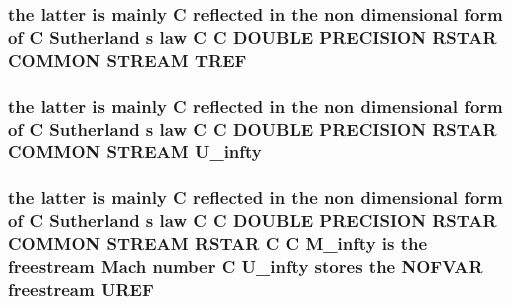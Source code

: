 \hypertarget{msa20_2home_2abonfi_2_c_f_d__codes_2_eul_f_s_83_82_83_2include_2stream_8com_a8c4a60ca1b033fbd4e2cadaf15146ca5}{
\subsubsection[{T\-R\-E\-F}]{\setlength{\rightskip}{0pt plus 5cm}the latter is mainly C reflected in the non dimensional form of C Sutherland s law C C D\-O\-U\-B\-L\-E P\-R\-E\-C\-I\-S\-I\-O\-N R\-S\-T\-A\-R C\-O\-M\-M\-O\-N S\-T\-R\-E\-A\-M T\-R\-E\-F}}\label{msa20_2home_2abonfi_2_c_f_d__codes_2_eul_f_s_83_82_83_2include_2stream_8com_a8c4a60ca1b033fbd4e2cadaf15146ca5}
\hypertarget{msa20_2home_2abonfi_2_c_f_d__codes_2_eul_f_s_83_82_83_2include_2stream_8com_a396c12357ce60c0aaccd169e136b5d9a}{
\subsubsection[{U\-\_\-infty}]{\setlength{\rightskip}{0pt plus 5cm}the latter is mainly C reflected in the non dimensional form of C Sutherland s law C C D\-O\-U\-B\-L\-E P\-R\-E\-C\-I\-S\-I\-O\-N R\-S\-T\-A\-R C\-O\-M\-M\-O\-N S\-T\-R\-E\-A\-M U\-\_\-infty}}\label{msa20_2home_2abonfi_2_c_f_d__codes_2_eul_f_s_83_82_83_2include_2stream_8com_a396c12357ce60c0aaccd169e136b5d9a}
\hypertarget{msa20_2home_2abonfi_2_c_f_d__codes_2_eul_f_s_83_82_83_2include_2stream_8com_ab0954e3210109eba37b309fef6a66996}{
\subsubsection[{U\-R\-E\-F}]{\setlength{\rightskip}{0pt plus 5cm}the latter is mainly C reflected in the non dimensional form of C Sutherland s law C C D\-O\-U\-B\-L\-E P\-R\-E\-C\-I\-S\-I\-O\-N R\-S\-T\-A\-R C\-O\-M\-M\-O\-N S\-T\-R\-E\-A\-M R\-S\-T\-A\-R C C {\bf M\-\_\-infty} is the freestream Mach number C {\bf U\-\_\-infty} stores the N\-O\-F\-V\-A\-R freestream U\-R\-E\-F}}\label{msa20_2home_2abonfi_2_c_f_d__codes_2_eul_f_s_83_82_83_2include_2stream_8com_ab0954e3210109eba37b309fef6a66996}
